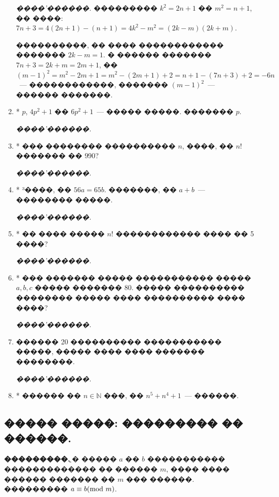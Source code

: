 \documentclass[a4paper,12pt]{article}
\begin{document}
\begin{enumerate}
\textit{����'������.} ��������� $k^{2}=2n+1$ �� $m^{2}=n+1$, �� ����: $7n+3 = 4(2n+1)-(n+1)=4k^{2}-m^{2}=(2k-m)(2k+m)$.

����������, �� ���� ������������ ������� $2k-m=1$. � ������ ������� $7n+3=2k+m=2m+1$, �� $(m-1)^{2}=m^{2}-2m+1 = m^{2} - (2m + 1) + 2 = n+1-(7n+3)+2 = -6n$~--- ������������, ������� $(m-1)^{2}$~--- ������ �������.

\item* $p$, $4p^{2}+1$ �� $6p^{2}+1$~--- ����� �����. ������� $p$.

\textit{����'������.}

\item* ��� �������� ���������� $n$, ����, �� $n!$ ������� �� $990$?

\textit{����'������.}

\item* ³����, �� $56a=65b$. �������, �� $a+b$~--- �������� �����.

\textit{����'������.}

\item* �� ���� ����� $n!$ ������������ ���� �� 5 ����?

\textit{����'������.}

\item* ��� ������� ����� ����������� ����� $a,b,c$ ����� ������� 80. ����� ���������� �������� ����� ���� ���������� ���� ����?

\textit{����'������.}

\item ������ 20 ���������� ����������� �����, ����� ���� ���� ������� ��������.

\textit{����'������.}

\item* ������ �� $n\in \mathbb{N}$ ���, �� $n^{5}+n^{4}+1$~--- ������.

\end{enumerate}








\newpage

\begin{center}
\section*{����� �����: ��������� �� ������.}
\end{center}

\textbf{���������.} ֳ� ����� $a$ �� $b$ ����������� ������������� �� ������ $m$, ���� ���� ������ ������� �� $m$ ��� ������. ��������� $a\equiv b (\textmd{mod } m)$.
\end{document}
